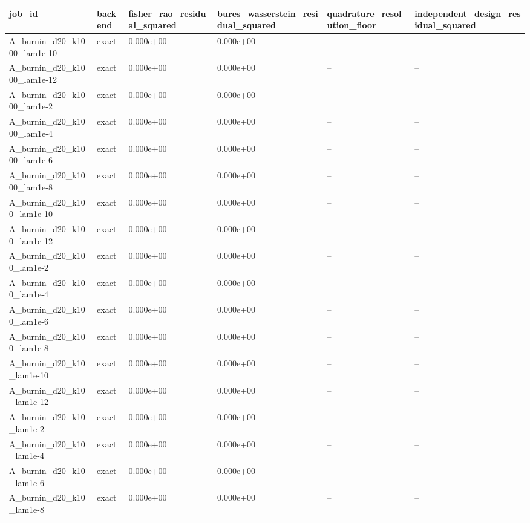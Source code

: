\begin{tabular}{llllll}
\toprule
job\_id & backend & fisher\_rao\_residual\_squared & bures\_wasserstein\_residual\_squared & quadrature\_resolution\_floor & independent\_design\_residual\_squared \\
\midrule
A\_burnin\_d20\_k1000\_lam1e-10 & exact & 0.000e+00 & 0.000e+00 & -- & -- \\
A\_burnin\_d20\_k1000\_lam1e-12 & exact & 0.000e+00 & 0.000e+00 & -- & -- \\
A\_burnin\_d20\_k1000\_lam1e-2 & exact & 0.000e+00 & 0.000e+00 & -- & -- \\
A\_burnin\_d20\_k1000\_lam1e-4 & exact & 0.000e+00 & 0.000e+00 & -- & -- \\
A\_burnin\_d20\_k1000\_lam1e-6 & exact & 0.000e+00 & 0.000e+00 & -- & -- \\
A\_burnin\_d20\_k1000\_lam1e-8 & exact & 0.000e+00 & 0.000e+00 & -- & -- \\
A\_burnin\_d20\_k100\_lam1e-10 & exact & 0.000e+00 & 0.000e+00 & -- & -- \\
A\_burnin\_d20\_k100\_lam1e-12 & exact & 0.000e+00 & 0.000e+00 & -- & -- \\
A\_burnin\_d20\_k100\_lam1e-2 & exact & 0.000e+00 & 0.000e+00 & -- & -- \\
A\_burnin\_d20\_k100\_lam1e-4 & exact & 0.000e+00 & 0.000e+00 & -- & -- \\
A\_burnin\_d20\_k100\_lam1e-6 & exact & 0.000e+00 & 0.000e+00 & -- & -- \\
A\_burnin\_d20\_k100\_lam1e-8 & exact & 0.000e+00 & 0.000e+00 & -- & -- \\
A\_burnin\_d20\_k10\_lam1e-10 & exact & 0.000e+00 & 0.000e+00 & -- & -- \\
A\_burnin\_d20\_k10\_lam1e-12 & exact & 0.000e+00 & 0.000e+00 & -- & -- \\
A\_burnin\_d20\_k10\_lam1e-2 & exact & 0.000e+00 & 0.000e+00 & -- & -- \\
A\_burnin\_d20\_k10\_lam1e-4 & exact & 0.000e+00 & 0.000e+00 & -- & -- \\
A\_burnin\_d20\_k10\_lam1e-6 & exact & 0.000e+00 & 0.000e+00 & -- & -- \\
A\_burnin\_d20\_k10\_lam1e-8 & exact & 0.000e+00 & 0.000e+00 & -- & -- \\

\end{tabular}
